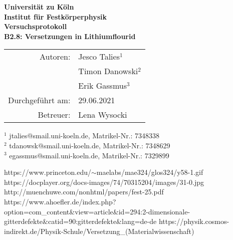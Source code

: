﻿\documentclass{article}
\begin{document}
 
 
\thispagestyle{empty}
\vspace*{\fill}
\begin{center}
	\Huge
	\textbf{Universität zu Köln}\\
	\LARGE
	\textbf{Institut für Festkörperphysik}\\
	\vspace{2cm}
	\textbf{Versuchsprotokoll}\\  
	\vspace{0.5cm}
	\large
	\textbf{B2.8: Versetzungen in Lithiumflourid}\\
	\normalsize
	\vspace{2cm}
	\begin{tabular}{r l}
		Autoren: 	& Jesco Talies$^1$\\
					& Timon Danowski$^2$\\
                    & Erik Gassmus$^3$\\
		Durchgeführt am:	& 29.06.2021\\
		Betreuer:	& Lena Wysocki
	\end{tabular}
\end{center}
\vfill\footnotesize
$^1$ jtalies@smail.uni-koeln.de, Matrikel-Nr.:  7348338\\
$^2$ tdanowsk@smail.uni-koeln.de, Matrikel-Nr.: 7348629\\
$^3$ egassmus@smail.uni-koeln.de, Matrikel-Nr.: 7329899\\
\normalsize

\newpage
\thispagestyle{empty}
\tableofcontents
\clearpage
\setcounter{page}{1}
  
   
  


% 

%



\begin{thebibliography}{9}
		https://www.princeton.edu/$\sim$maelabs/mae324/glos324/y58-1.gif
		https://docplayer.org/docs-images/74/70315204/images/31-0.jpg
		http://muenchuwe.com/nonhtml/papers/fest-25.pdf
		https://www.ahoefler.de/index.php?option=com\_content\&view=article\&id=294:2-dimensionale-gitterdefekte\&catid=90:gitterdefekte\&lang=de-de
		https://physik.cosmos-indirekt.de/Physik-Schule/Versetzung\_(Materialwissenschaft)
\end{thebibliography}
\end{document}
